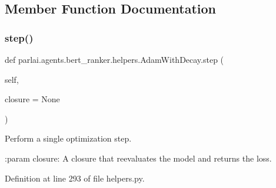 \subsection{Member Function Documentation}
\mbox{\label{classparlai_1_1agents_1_1bert__ranker_1_1helpers_1_1AdamWithDecay_aeb41188377c1a61b4638228abd6c3e64}} 
\subsubsection{\texorpdfstring{step()}{step()}}
{\footnotesize\ttfamily def parlai.\+agents.\+bert\+\_\+ranker.\+helpers.\+Adam\+With\+Decay.\+step (\begin{DoxyParamCaption}\item[{}]{self,  }\item[{}]{closure = {\ttfamily None} }\end{DoxyParamCaption})}

\begin{DoxyVerb}Perform a single optimization step.

:param closure:
    A closure that reevaluates the model and returns the loss.
\end{DoxyVerb}
 

Definition at line 293 of file helpers.\+py.


